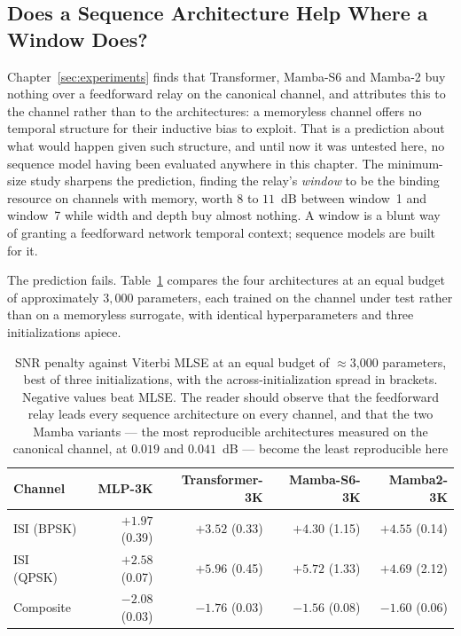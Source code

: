 \subsection{Does a Sequence Architecture Help Where a Window Does?}\label{sec:sequence-on-memory}

Chapter~\ref{sec:experiments} finds that Transformer, Mamba-S6 and Mamba-2 buy nothing over a feedforward relay on the canonical channel, and attributes this to the channel rather than to the architectures: a memoryless channel offers no temporal structure for their inductive bias to exploit. That is a prediction about what would happen given such structure, and until now it was untested here, no sequence model having been evaluated anywhere in this chapter. The minimum-size study sharpens the prediction, finding the relay's \emph{window} to be the binding resource on channels with memory, worth $8$ to $11$~dB between window~1 and window~7 while width and depth buy almost nothing. A window is a blunt way of granting a feedforward network temporal context; sequence models are built for it.

The prediction fails. Table~\ref{tbl:seq-on-memory} compares the four architectures at an equal budget of approximately $3{,}000$ parameters, each trained on the channel under test rather than on a memoryless surrogate, with identical hyperparameters and three initializations apiece.

\begin{table}[htbp]
\centering
\caption[Sequence architectures on channels with memory]{SNR penalty against Viterbi MLSE at an equal budget of $\approx$3{,}000 parameters, best of three initializations, with the across-initialization spread in brackets. Negative values beat MLSE. The reader should observe that the feedforward relay leads every sequence architecture on every channel, and that the two Mamba variants --- the most reproducible architectures measured on the canonical channel, at $0.019$ and $0.041$~dB --- become the least reproducible here}\label{tbl:seq-on-memory}
\begin{tabular}{lrrrr}
\toprule
Channel & MLP-3K & Transformer-3K & Mamba-S6-3K & Mamba2-3K \\
\midrule
ISI (BPSK) & $\mathbf{+1.97}$ (0.39) & $+3.52$ (0.33) & $+4.30$ (1.15) & $+4.55$ (0.14) \\
ISI (QPSK) & $\mathbf{+2.58}$ (0.07) & $+5.96$ (0.45) & $+5.72$ (1.33) & $+4.69$ (2.12) \\
Composite  & $\mathbf{-2.08}$ (0.03) & $-1.76$ (0.03) & $-1.56$ (0.08) & $-1.60$ (0.06) \\
\bottomrule
\end{tabular}
\end{table}

